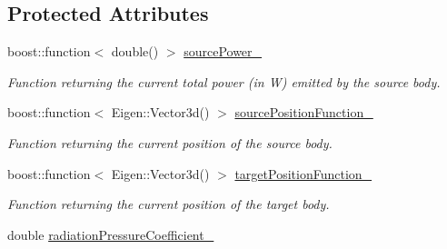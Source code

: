 \subsection*{Protected Attributes}
\begin{DoxyCompactItemize}
\item 
boost\+::function$<$ double() $>$ \hyperlink{classtudat_1_1electro__magnetism_1_1RadiationPressureInterface_a6d59e036b87d0fe805427400e491cb3a}{source\+Power\+\_\+}\hypertarget{classtudat_1_1electro__magnetism_1_1RadiationPressureInterface_a6d59e036b87d0fe805427400e491cb3a}{}\label{classtudat_1_1electro__magnetism_1_1RadiationPressureInterface_a6d59e036b87d0fe805427400e491cb3a}

\begin{DoxyCompactList}\small\item\em Function returning the current total power (in W) emitted by the source body. \end{DoxyCompactList}\item 
boost\+::function$<$ Eigen\+::\+Vector3d() $>$ \hyperlink{classtudat_1_1electro__magnetism_1_1RadiationPressureInterface_a4b5a361fefba821f2ae123ac0ee8cca0}{source\+Position\+Function\+\_\+}\hypertarget{classtudat_1_1electro__magnetism_1_1RadiationPressureInterface_a4b5a361fefba821f2ae123ac0ee8cca0}{}\label{classtudat_1_1electro__magnetism_1_1RadiationPressureInterface_a4b5a361fefba821f2ae123ac0ee8cca0}

\begin{DoxyCompactList}\small\item\em Function returning the current position of the source body. \end{DoxyCompactList}\item 
boost\+::function$<$ Eigen\+::\+Vector3d() $>$ \hyperlink{classtudat_1_1electro__magnetism_1_1RadiationPressureInterface_af9a23761b1c8aab7aadfd36011c4189c}{target\+Position\+Function\+\_\+}\hypertarget{classtudat_1_1electro__magnetism_1_1RadiationPressureInterface_af9a23761b1c8aab7aadfd36011c4189c}{}\label{classtudat_1_1electro__magnetism_1_1RadiationPressureInterface_af9a23761b1c8aab7aadfd36011c4189c}

\begin{DoxyCompactList}\small\item\em Function returning the current position of the target body. \end{DoxyCompactList}\item 
double \hyperlink{classtudat_1_1electro__magnetism_1_1RadiationPressureInterface_ac18b9903296ad8cb5b48940fee633696}{radiation\+Pressure\+Coefficient\+\_\+}\hypertarget{classtudat_1_1electro__magnetism_1_1RadiationPressureInterface_ac18b9903296ad8cb5b48940fee633696}{}\label{classtudat_1_1electro__magnetism_1_1RadiationPressureInterface_ac18b9903296ad8cb5b48940fee633696}


\end{DoxyCompactItemize}
